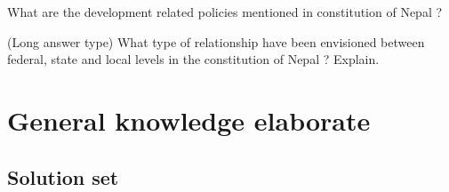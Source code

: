 \documentclass[
  openany]{book}
\newcommand{\question}{\item}
\begin{document}
\begin{questions}

\question What are the development related policies mentioned in constitution of Nepal ?

\question (Long answer type) What type of relationship have been envisioned between federal, state and local levels in the constitution of Nepal ? Explain.

\end{questions}

\hypertarget{general-knowledge-elaborate}{%
\chapter{General knowledge elaborate}\label{general-knowledge-elaborate}}

\hypertarget{solution-set}{%
\section{Solution set}\label{solution-set}}
\end{document}
